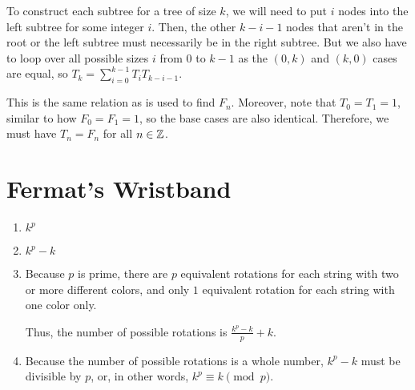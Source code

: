 \documentclass{article}
\begin{document}
\begin{enumerate}[label=\alph*)]
			To construct each subtree for a tree of size $k$, we will need to put
			$i$ nodes into the left subtree for some integer $i$. Then, the other $k-i-1$ nodes
			that aren't in the root or the left subtree must necessarily be in the right 
			subtree. But we also have to loop over all possible sizes $i$ from $0$ to $k-1$
			as the $(0, k)$ and $(k, 0)$ cases are equal, so 
			$T_k = \sum_{i=0}^{k-1} T_i T_{k-i-1}$.

			This is the same relation as is used to find $F_n$. Moreover, note that $T_0 = T_1 = 1$,
			similar to how $F_0 = F_1 = 1$, so the base cases are also identical. Therefore,
			we must have $T_n = F_n$ for all $n \in \mathbb Z$.

	\end{enumerate}
	\section{Fermat's Wristband}
	\begin{enumerate}[label=\alph*)]
		\item $k^p$
		\item $k^p - k$
		\item Because $p$ is prime, there are $p$ equivalent rotations for each string 
			with two or more different colors, and only $1$ equivalent rotation for each string
			with one color only. 

			Thus, the number of possible rotations is $\frac{k^p-k}{p} + k$.
		\item Because the number of possible rotations is a whole number, $k^p - k$ must
			be divisible by $p$, or, in other words, $k^p \equiv k \pmod p$.
	\end{enumerate}

	\newpage
\end{document}
